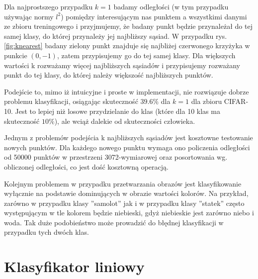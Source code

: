 Dla najprostszego przypadku $k=1$ badamy odległości (w tym przypadku używając normy $l^2$) pomiędzy interesującym nas punktem a wszystkimi danymi ze zbioru treningowego i przyjmujemy, że badany punkt będzie przynależał do tej samej klasy, do której przynależy jej najbliższy sąsiad.
W przypadku rys. \ref{fig:knearest} badany zielony punkt znajduje się najbliżej czerwonego krzyżyka w punkcie $(0,-1)$, zatem przypisujemy go do tej samej klasy.
Dla większych wartości k rozważamy więcej najbliższych sąsiadów i przypisujemy rozważany punkt do tej klasy, do której należy większość najbliższych punktów.

Podejście to, mimo iż intuicyjne i proste w implementacji, nie rozwiązuje dobrze problemu klasyfikacji, osiągając skuteczność $39.6\%$ dla $k = 1$ dla zbioru CIFAR-10.
Jest to lepiej niż losowe przydzielanie do klas (które dla 10 klas ma skuteczność $10\%$), ale wciąż dalekie od skuteczności człowieka.

Jednym z problemów podejścia k najbliższych sąsiadów jest kosztowne testowanie nowych punktów.
Dla każdego nowego punktu wymaga ono policzenia odległości od 50000 punktów w przestrzeni 3072-wymiarowej oraz posortowania wg. obliczonej odległości, co jest dość kosztowną operacją.

Kolejnym problemem w przypadku przetwarzania obrazów jest klasyfikowanie wyłącznie na podstawie dominujących w obrazie wartości kolorów.
Na przykład, zarówno w przypadku klasy ''samolot'' jak i w przypadku klasy ''statek'' często występującym w tle kolorem będzie niebieski, gdyż niebieskie jest zarówno niebo i woda.
Tak duże podobieństwo może prowadzić do błędnej klasyfikacji w przypadku tych dwóch klas. \cite{cs231n}

\section{Klasyfikator liniowy}\label{sec:linear_classifier}

